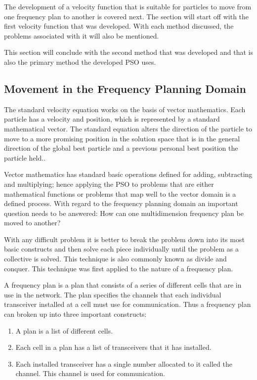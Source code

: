 The development of a velocity function that is suitable for particles to move from one frequency plan to another is covered next. The section will start off with the first velocity function that was developed. With each method discussed, the problems associated with it will also be mentioned. 

This section will conclude with the second method that was developed and that is also the primary method the developed PSO uses.

\subsection{Movement in the Frequency Planning Domain}
The standard velocity equation works on the basis of vector mathematics. Each particle has a velocity and position, which is represented by a standard mathematical vector. The standard equation alters the direction of the particle to move to a more promising position in the solution space that is in the general direction of the global best particle and a previous personal best position the particle held..

Vector mathematics has standard basic operations defined for adding, subtracting and multiplying; hence applying the PSO to problems that are either mathematical functions or problems that map well to the vector domain is a defined process. With regard to the frequency planning domain an important question needs to be answered: How can one multidimension frequency plan be moved to another?

With any difficult problem it is better to break the problem down into its most basic constructs and then solve each piece individually until the problem as a collective is solved. This technique is also commonly known as divide and conquer. This technique was first applied to the nature of a frequency plan.

A frequency plan is a plan that consists of a series of different cells that are in use in the network. The plan specifies the channels that each individual transceiver installed at a cell must use for communication. Thus a frequency plan can broken up into three important constructs:
\begin{enumerate}
\item A plan is a list of different cells.
\item Each cell in a plan has a list of transceivers that it has installed.
\item Each installed transceiver has a single number allocated to it called the channel. This channel is used for communication.
\end{enumerate}

